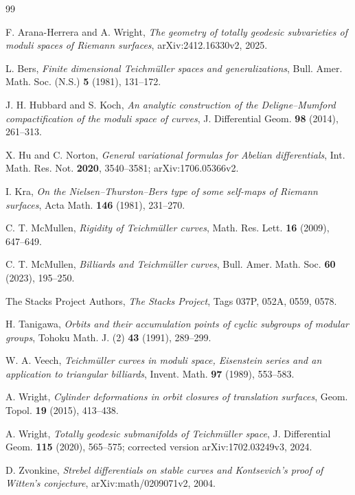 \documentclass[12pt]{article}
\theoremstyle{remark}
\begin{document}
\begin{thebibliography}{99}

F. Arana-Herrera and A. Wright,
\emph{The geometry of totally geodesic subvarieties of moduli spaces
of Riemann surfaces}, arXiv:2412.16330v2, 2025.

L. Bers,
\emph{Finite dimensional Teichm\"uller spaces and generalizations},
Bull. Amer. Math. Soc. (N.S.) \textbf{5} (1981), 131--172.

J. H. Hubbard and S. Koch,
\emph{An analytic construction of the Deligne--Mumford
compactification of the moduli space of curves},
J. Differential Geom. \textbf{98} (2014), 261--313.

X. Hu and C. Norton,
\emph{General variational formulas for Abelian differentials},
Int. Math. Res. Not. \textbf{2020}, 3540--3581; arXiv:1706.05366v2.

I. Kra,
\emph{On the Nielsen--Thurston--Bers type of some self-maps
of Riemann surfaces},
Acta Math. \textbf{146} (1981), 231--270.

C. T. McMullen,
\emph{Rigidity of Teichm\"uller curves},
Math. Res. Lett. \textbf{16} (2009), 647--649.

C. T. McMullen,
\emph{Billiards and Teichm\"uller curves},
Bull. Amer. Math. Soc. \textbf{60} (2023), 195--250.

The Stacks Project Authors,
\emph{The Stacks Project}, Tags 037P, 052A, 0559, 0578.

H. Tanigawa,
\emph{Orbits and their accumulation points of cyclic subgroups
of modular groups},
Tohoku Math. J. (2) \textbf{43} (1991), 289--299.

W. A. Veech,
\emph{Teichm\"uller curves in moduli space, Eisenstein series and
an application to triangular billiards},
Invent. Math. \textbf{97} (1989), 553--583.

A. Wright,
\emph{Cylinder deformations in orbit closures of translation surfaces},
Geom. Topol. \textbf{19} (2015), 413--438.

A. Wright,
\emph{Totally geodesic submanifolds of Teichm\"uller space},
J. Differential Geom. \textbf{115} (2020), 565--575;
corrected version arXiv:1702.03249v3, 2024.

D. Zvonkine,
\emph{Strebel differentials on stable curves and
Kontsevich's proof of Witten's conjecture},
arXiv:math/0209071v2, 2004.

\end{thebibliography}
\end{document}
